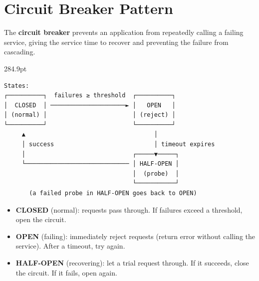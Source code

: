 \setcounter{section}{6}
\section{Circuit Breaker Pattern}\label{37-reliability:377-circuit-breaker-pattern}

The \textbf{circuit breaker} prevents an application from repeatedly calling a failing service, giving the service time to recover and preventing the failure from cascading.

\begin{diagrambox}[short]{284.9pt}
\begin{Verbatim}[fontsize=\fontsize{9.0}{8.55}\selectfont]
States:
┌──────────┐  failures ≥ threshold  ┌──────────┐
│  CLOSED  │ ─────────────────────► │   OPEN   │
│ (normal) │                        │ (reject) │
└──────────┘                        └──────────┘
     ▲                                    │
     │ success                            │ timeout expires
     │                              ┌─────▼─────┐
     └───────────────────────────── │ HALF-OPEN │
                                    │  (probe)  │
                                    └───────────┘
       (a failed probe in HALF-OPEN goes back to OPEN)
\end{Verbatim}
\end{diagrambox}

\begin{itemize}
\tightlist
\item
  \textbf{CLOSED} (normal): requests pass through. If failures exceed a threshold, open the circuit.
\item
  \textbf{OPEN} (failing): immediately reject requests (return error without calling the service). After a timeout, try again.
\item
  \textbf{HALF-OPEN} (recovering): let a trial request through. If it succeeds, close the circuit. If it fails, open again.
\end{itemize}

